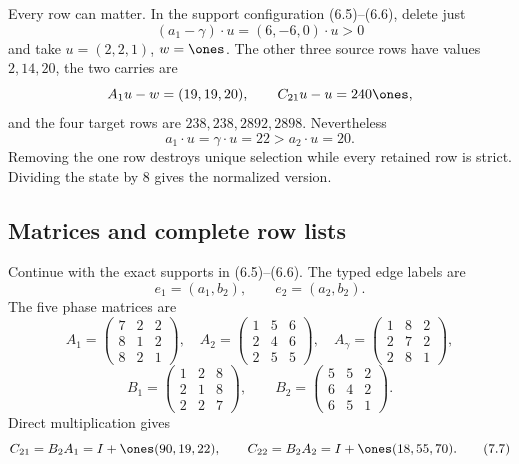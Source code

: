 \documentclass[11pt]{article}
\theoremstyle{definition}
\theoremstyle{remark}
\begin{document}
Every row can matter.  In the support configuration (6.5)--(6.6), delete
just
\[
 (a_1-\gamma)\cdot u=(6,-6,0)\cdot u>0
\]
and take \(u=(2,2,1)\), \(w=\ones\).  The other three source rows have
values \(2,14,20\), the two carries are
\[
 A_1u-w=(19,19,20),\qquad C_{21}u-u=240\ones,
\]
and the four target rows are \(238,238,2892,2898\).  Nevertheless
\[
 a_1\cdot u=\gamma\cdot u=22>a_2\cdot u=20.
\]
Removing the one row destroys unique selection while every retained row is
strict.  Dividing the state by \(8\) gives the normalized version.

\subsection{Matrices and complete row lists}

Continue with the exact supports in (6.5)--(6.6).  The typed edge labels are
\[
 e_1=(a_1,b_2),\qquad e_2=(a_2,b_2).
\]
The five phase matrices are
\[
 A_1=\begin{pmatrix}7&2&2\\8&1&2\\8&2&1\end{pmatrix},\quad
 A_2=\begin{pmatrix}1&5&6\\2&4&6\\2&5&5\end{pmatrix},\quad
 A_\gamma=\begin{pmatrix}1&8&2\\2&7&2\\2&8&1\end{pmatrix},
\tag{7.5}
\]
\[
 B_1=\begin{pmatrix}1&2&8\\2&1&8\\2&2&7\end{pmatrix},\qquad
 B_2=\begin{pmatrix}5&5&2\\6&4&2\\6&5&1\end{pmatrix}.
\tag{7.6}
\]
Direct multiplication gives
\[
 C_{21}=B_2A_1=I+\ones(90,19,22),\qquad
 C_{22}=B_2A_2=I+\ones(18,55,70).
\tag{7.7}
\]
\end{document}
